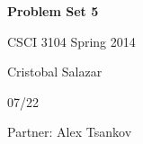 \documentclass[11pt]{article} %
\begin{document}
\centerline{{ \LARGE \bf Problem Set 5}} 
\centerline{CSCI 3104 Spring 2014} 
\centerline{Cristobal Salazar}
\centerline{07/22}
\centerline{Partner: Alex Tsankov}

\\
\\
\\


\\

\\

\\

\\

\\
\indent{\large }
\\

\\
\\

\\

\\

\\

\\
\\

\\
\end{document}
